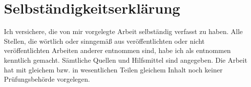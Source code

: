 \section*{Selbständigkeitserklärung}
Ich versichere, die von mir vorgelegte Arbeit selbständig verfasst zu haben. Alle
Stellen, die wörtlich oder sinngemäß aus veröffentlichten oder nicht veröffentlichten
Arbeiten anderer entnommen sind, habe ich als entnommen kenntlich gemacht.
Sämtliche Quellen und Hilfsmittel sind angegeben. Die Arbeit hat mit gleichem bzw.
in wesentlichen Teilen gleichem Inhalt noch keiner Prüfungsbehörde vorgelegen.
